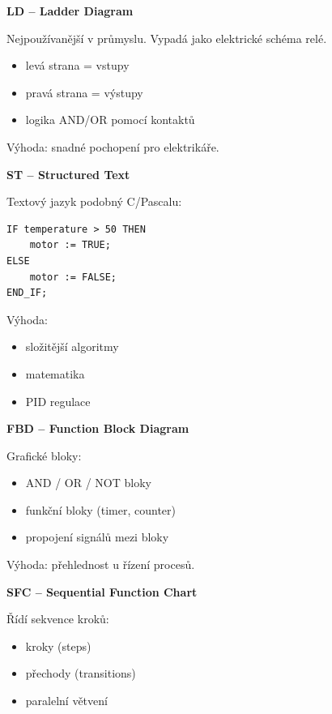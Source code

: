 \documentclass[a4paper,10pt]{article}
\begin{document}
\begin{vysvetlenibox}
\textbf{LD – Ladder Diagram}

Nejpoužívanější v průmyslu. Vypadá jako elektrické schéma relé.

\begin{itemize}
\item levá strana = vstupy
\item pravá strana = výstupy
\item logika AND/OR pomocí kontaktů
\end{itemize}

Výhoda: snadné pochopení pro elektrikáře.

\textbf{ST – Structured Text}

Textový jazyk podobný C/Pascalu:

\begin{vzorcebox}
\begin{verbatim}
IF temperature > 50 THEN
    motor := TRUE;
ELSE
    motor := FALSE;
END_IF;
\end{verbatim}
\end{vzorcebox}

Výhoda:
\begin{itemize}
\item složitější algoritmy
\item matematika
\item PID regulace
\end{itemize}

\textbf{FBD – Function Block Diagram}

Grafické bloky:

\begin{itemize}
\item AND / OR / NOT bloky
\item funkční bloky (timer, counter)
\item propojení signálů mezi bloky
\end{itemize}

Výhoda: přehlednost u řízení procesů.

\textbf{SFC – Sequential Function Chart}

Řídí sekvence kroků:

\begin{itemize}
\item kroky (steps)
\item přechody (transitions)
\item paralelní větvení
\end{itemize}


\end{vysvetlenibox}
\end{document}
